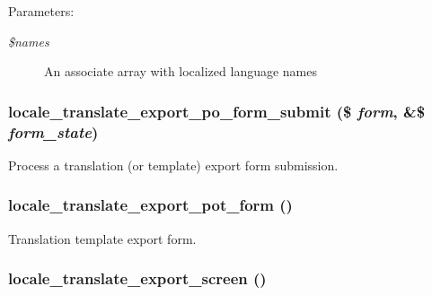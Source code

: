 \begin{Desc}
\item[Parameters:]
\begin{description}
\item[{\em \$names}]An associate array with localized language names \end{description}
\end{Desc}
\hypertarget{group__locale_ga8f71c53db9e03719bdeae8f594fb0ee}{
\subsubsection[{locale\_\-translate\_\-export\_\-po\_\-form\_\-submit}]{\setlength{\rightskip}{0pt plus 5cm}locale\_\-translate\_\-export\_\-po\_\-form\_\-submit (\$ {\em form}, \/  \&\$ {\em form\_\-state})}}
\label{group__locale_ga8f71c53db9e03719bdeae8f594fb0ee}


Process a translation (or template) export form submission. \hypertarget{group__locale_g670f0a541fc0b97da4bf4624c2afb434}{
\subsubsection[{locale\_\-translate\_\-export\_\-pot\_\-form}]{\setlength{\rightskip}{0pt plus 5cm}locale\_\-translate\_\-export\_\-pot\_\-form ()}}
\label{group__locale_g670f0a541fc0b97da4bf4624c2afb434}


Translation template export form. \hypertarget{group__locale_ga04044044d6c484553a41432db3924b4}{
\subsubsection[{locale\_\-translate\_\-export\_\-screen}]{\setlength{\rightskip}{0pt plus 5cm}locale\_\-translate\_\-export\_\-screen ()}}
\label{group__locale_ga04044044d6c484553a41432db3924b4}


